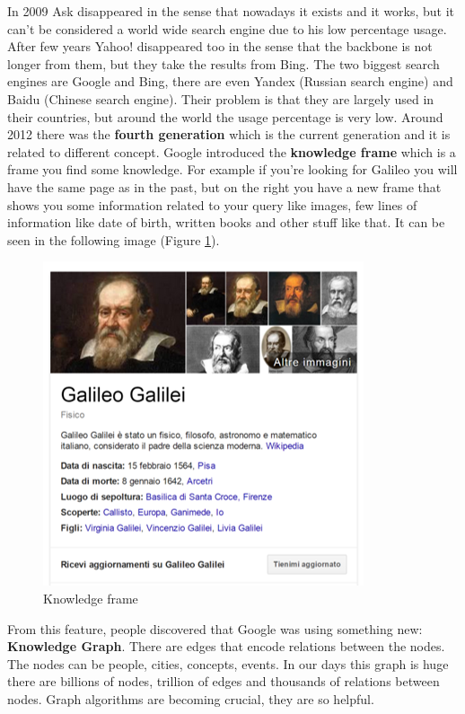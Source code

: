 In 2009 Ask disappeared in the sense that nowadays it exists and it works, but it can't be considered a world wide search engine due to his low percentage usage. After few years Yahoo! disappeared too in the sense that the backbone is not longer from them, but they take the results from Bing.\newline
The two biggest search engines are Google and Bing, there are even Yandex (Russian search engine) and Baidu (Chinese search engine). Their problem is that they are largely used in their countries, but around the world the usage percentage is very low.\newline
Around 2012 there was the \textbf{fourth generation} which is the current generation and it is related to different concept. Google introduced the \textbf{knowledge frame} which is a frame you find some knowledge.\newline
For example if you're looking for Galileo you will have the same page as in the past, but on the right you have a new frame that shows you some information related to your query like images, few lines of information like date of birth, written books and other stuff like that. It can be seen in the following image (Figure \ref{fig:galileo}).
\begin{figure}
    \centering
    \includegraphics[width=0.55\linewidth]{images/knowledgeFrame.png}
    \caption{Knowledge frame}
    \label{fig:galileo}
\end{figure}
From this feature, people discovered that Google was using something new: \textbf{Knowledge Graph}. There are edges that encode relations between the nodes. The nodes can be people, cities, concepts, events. 
In our days this graph is huge there are billions of nodes, trillion of edges and thousands of relations between nodes.\newline
Graph algorithms are becoming crucial, they are so helpful.\newline

